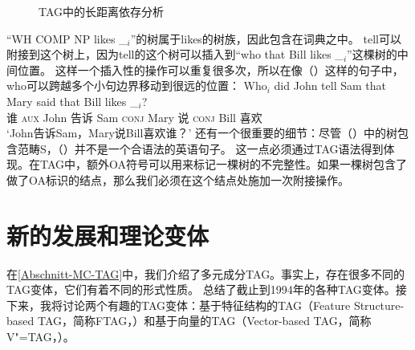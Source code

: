 \begin{figure}
\caption{\label{abb-nld-TAG}TAG中的长距离依存分析}
\end{figure}%
“WH COMP NP likes \_$_i$”的树属于likes的树族，因此包含在词典之中。
tell可以附接到这个树上，因为tell的这个树可以插入到“who that Bill likes \_$_i$”这棵树的中间位置。
这样一个插入性的操作可以重复很多次，所以在像（）这样的句子中，who可以跨越多个小句边界移动到很远的位置：
\ea 
\gll Who$_i$ did John tell Sam that Mary said that Bill likes \_$_i$?\\
     谁      \textsc{aux} John 告诉 Sam \textsc{conj} Mary 说 \textsc{conj} Bill 喜欢\\
\glt `John告诉Sam，Mary说Bill喜欢谁？'
\z
%
还有一个很重要的细节：尽管（）中的树包含范畴S，（）并不是一个合语法的英语句子。
\z
这一点必须通过TAG语法得到体现。在TAG中，额外OA符号可以用来标记一棵树的不完整性。如果一棵树包含了做了OA标识的结点，那么我们必须在这个结点处施加一次附接操作。

\section{新的发展和理论变体}

在\ref{Abschnitt-MC-TAG}中，我们介绍了多元成分TAG。事实上，存在很多不同的TAG变体，它们有着不同的形式性质。
\citet[\page]{Rambow94a}总结了截止到1994年的各种TAG变体。接下来，我将讨论两个有趣的TAG变体：基于特征结构的TAG（Feature Structure-based TAG，简称FTAG\indexftagc，\citealp{VSJ88a}）和基于向量的TAG（Vector-based TAG，简称V"=TAG，\citealp{Rambow94a}）。

